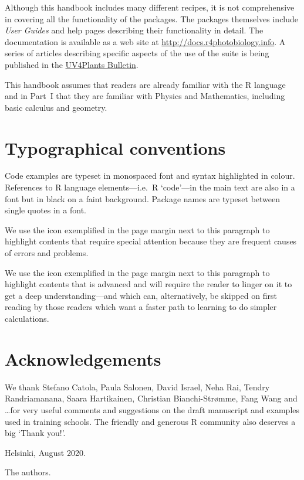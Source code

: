 Although this handbook includes many different recipes, it is not comprehensive in covering all the functionality of the packages. The packages themselves include \emph{User Guides} and help pages describing their functionality in detail. The documentation is available as a web site at \url{http://docs.r4photobiology.info}. A series of articles describing specific aspects of the use of the suite is being published in the \href{http://uv4plants.org/publications/uv4plants-bulletin-published-issues/}{UV4Plants Bulletin}.

This handbook assumes that readers are already familiar with the R language and in Part~I that they are familiar with Physics and Mathematics, including basic calculus and geometry.

\section{Typographical conventions}

Code examples are typeset in monospaced font and syntax highlighted in colour. References to R language elements---i.e.\ R `code'---in the main text are also in a  font but in black on a faint background. Package names are typeset between single quotes in a  font.

We\Attention{} use the icon exemplified in the page margin next to this paragraph to highlight contents that require special attention because they are frequent causes of errors and problems.

We\Advanced{} use the icon exemplified in the page margin next to this paragraph to highlight contents that is advanced and will require the reader to linger on it to get a deep understanding---and which can, alternatively, be skipped on first reading by those readers which want a faster path to learning to do simpler calculations.

\section{Acknowledgements}

We thank Stefano Catola, Paula Salonen, David Israel, Neha Rai, Tendry Randriamanana, Saara Hartikainen, Christian Bianchi-Str{\o}mme, Fang Wang and \ldots for very useful comments and suggestions on the draft manuscript and examples used in training schools. The friendly and generous R community also deserves a big `Thank you!'.

Helsinki, August 2020.

The authors. 